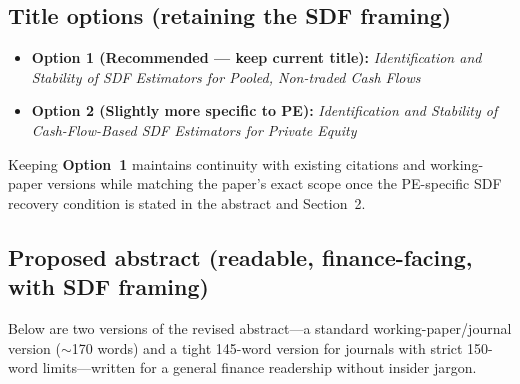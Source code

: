 \documentclass[11pt]{article}
\begin{document}
\subsection{Title options (retaining the SDF framing)}

\begin{itemize}
\item \textbf{Option 1 (Recommended — keep current title):} \emph{Identification and Stability of SDF Estimators for Pooled, Non-traded Cash Flows}
\item \textbf{Option 2 (Slightly more specific to PE):} \emph{Identification and Stability of Cash-Flow-Based SDF Estimators for Private Equity}
\end{itemize}
Keeping \textbf{Option~1} maintains continuity with existing citations and working-paper versions while matching the paper's exact scope once the PE-specific SDF recovery condition is stated in the abstract and Section~2.

\subsection{Proposed abstract (readable, finance-facing, with SDF framing)}

Below are two versions of the revised abstract—a standard working-paper/journal version ($\sim$170 words) and a tight 145-word version for journals with strict 150-word limits—written for a general finance readership without insider jargon.
\end{document}
